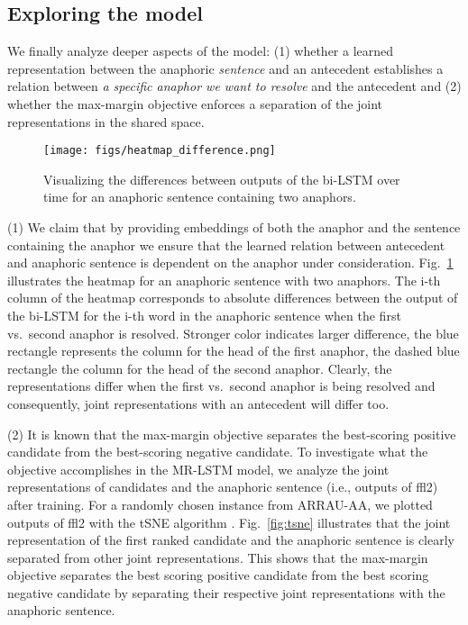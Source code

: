 \documentclass[11pt,letterpaper]{article}
\begin{document}
\subsection{Exploring the model}

We finally analyze deeper aspects of the model: (1) whether a learned representation between the anaphoric {\em sentence} and an antecedent establishes a relation between {\em a specific anaphor we want to resolve} and the antecedent and (2) whether the max-margin objective enforces a separation of the joint representations in the shared space. 

\begin{figure}[t]
\centering
\texttt{[image: figs/heatmap\_difference.png]}
\caption{Visualizing the differences between outputs of the bi-LSTM over time for an anaphoric sentence containing two anaphors.}
\label{fig:heatmap}
\vspace*{-4mm}
\end{figure}

(1) 
We claim that 
by providing embeddings of both the anaphor and the sentence containing the anaphor we ensure that the learned relation between antecedent and anaphoric sentence
is dependent on the anaphor under consideration. Fig.\ \ref{fig:heatmap} illustrates the heatmap for an anaphoric sentence with two anaphors. The i-th column of the heatmap corresponds to absolute differences between the output of the bi-LSTM for the i-th word in the anaphoric sentence when the first vs.\ second anaphor is resolved.
Stronger color indicates larger difference, the blue rectangle represents the column for the head of the first anaphor, the dashed blue rectangle the column for the head of the second anaphor. Clearly, the representations differ when the first vs.\  second anaphor is being resolved and 
consequently, joint representations with an antecedent will differ too. 

(2) It is known that the max-margin objective separates the best-scoring positive candidate from the best-scoring negative candidate. To investigate what the objective accomplishes in the MR-LSTM model, we analyze
the joint representations of candidates and the anaphoric sentence (i.e., outputs of ffl2)
after training. For a randomly chosen instance from ARRAU-AA, we plotted outputs of 
ffl2 with the tSNE algorithm \cite{van2008visualizing}. Fig.\ \ref{fig:tsne} illustrates that the joint representation of the first ranked candidate and the anaphoric sentence is clearly separated from other joint representations. 
This shows that the max-margin objective separates the best scoring positive candidate from the best scoring negative candidate by separating their respective joint representations with the anaphoric sentence.
\end{document}

